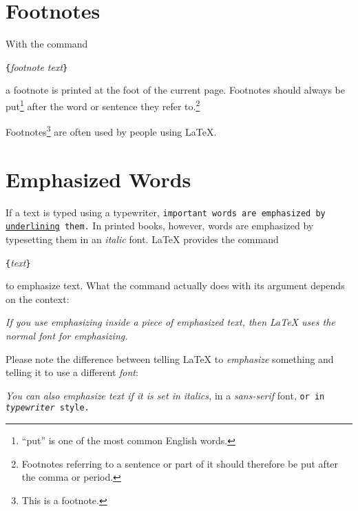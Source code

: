 
\section{Footnotes}
With the command
\begin{command}
\verb|{|\emph{footnote text}\verb|}|
\end{command}
\noindent a footnote is printed at the foot of the current page.  Footnotes
should always be put\footnote{``put'' is one of the most common
  English words.} after the word or sentence they refer
to.\footnote{Footnotes referring to a sentence or part of it should
  therefore be put after the comma or period.}

\begin{example}
Footnotes\footnote{This is 
  a footnote.} are often used 
by people using \LaTeX.
\end{example}
 
\section{Emphasized Words}

If a text is typed using a typewriter, \texttt{important words are
  emphasized by \underline{underlining} them.}  In printed books,
however, words are emphasized by typesetting them in an \emph{italic}
font.  \LaTeX{} provides the command
\begin{command}
\verb|{|\emph{text}\verb|}|
\end{command}
\noindent to emphasize text.  What the command actually does with 
its argument depends on the context:

\begin{example}
\emph{If you use 
  emphasizing inside a piece
  of emphasized text, then 
  \LaTeX{} uses the
  \emph{normal} font for 
  emphasizing.}
\end{example}

Please note the difference between telling \LaTeX{} to
\emph{emphasize} something and telling it to use a different
\emph{font}:

\begin{example}
\textit{You can also
  \emph{emphasize} text if 
  it is set in italics,} 
\textsf{in a 
  \emph{sans-serif} font,}
\texttt{or in 
  \emph{typewriter} style.}
\end{example}

